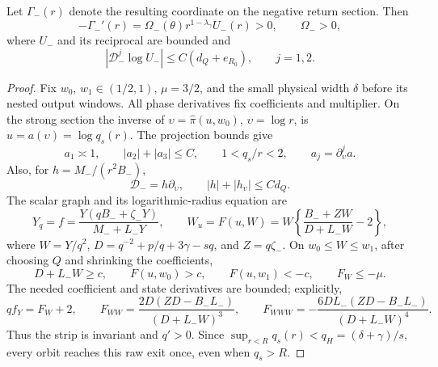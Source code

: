\begin{lemma}\label{ann:lem-negative-gate}
Let \(\Gamma_-(r)\) denote the resulting coordinate on the negative
return section.
Then
\begin{equation}\label{ann:negative-gate-derivative}
 -\Gamma_-'(r)=\Omega_-(\theta)r^{1-\lambda_\gamma}U_-(r)>0,
 \qquad \Omega_->0,
\end{equation}
where \(U_-\) and its reciprocal are bounded and
\begin{equation}\label{ann:negative-gate-jets}
 |\mathcal D_-^j\log U_-|\le C(d_Q+e_{R_0}),\qquad j=1,2 .
\end{equation}
\end{lemma}
\begin{proof}
Fix \(w_0\), \(w_1\in(1/2,1)\), \(\mu=3/2\), and the small
physical width \(\delta\) before its nested output windows. All phase
derivatives fix coefficients and multiplier. On the strong section the
inverse of \(\upsilon=\widehat\pi(u,w_0)\), \(\upsilon=\log r\), is
\(u=a(\upsilon)=\log q_s(r)\). The projection bounds give
\begin{equation}\label{ann:repair-inverse-start}
 a_1\asymp1,\qquad |a_2|+|a_3|\le C,\qquad 1<q_s/r<2,
 \qquad a_j=\partial_\upsilon^j a.
\end{equation}
Also, for \(h=M_-/(r^2B_-)\),
\begin{equation}\label{ann:repair-action-budget}
 \mathcal D_-=h\partial_\upsilon,\qquad
 |h|+|h_\upsilon|\le Cd_Q.
\end{equation}
The scalar graph and its logarithmic-radius equation are
\begin{equation}\label{ann:negative-scalar-graph}
 Y_q=f=\frac{Y(qB_-+\zeta_-Y)}{M_-+L_-Y},\qquad
 W_u=F(u,W)=W\left\{\frac{B_-+ZW}{D+L_-W}-2\right\},
\end{equation}
where \(W=Y/q^2\), \(D=q^{-2}+p/q+3\gamma-sq\), and \(Z=q\zeta_-\).
On \(w_0\le W\le w_1\), after choosing \(Q\) and shrinking the
coefficients,
\begin{equation}\label{ann:repair-outgoing-strip}
 D+L_-W\ge c,\qquad F(u,w_0)>c,\qquad F(u,w_1)<-c,\qquad F_W\le-\mu.
\end{equation}
The needed coefficient and state derivatives are bounded; explicitly,
\begin{equation}\label{ann:repair-rational-identities}
 qf_Y=F_W+2,\qquad
 F_{WW}=\frac{2D(ZD-B_-L_-)}{(D+L_-W)^3},\qquad
 F_{WWW}=-\frac{6DL_-(ZD-B_-L_-)}{(D+L_-W)^4}.
\end{equation}
Thus the strip is invariant and \(q'>0\). Since
\(\sup_{r<R}q_s(r)<q_H=(\delta+\gamma)/s\), every orbit reaches
this raw exit once, even when \(q_s>R\).


\end{proof}
